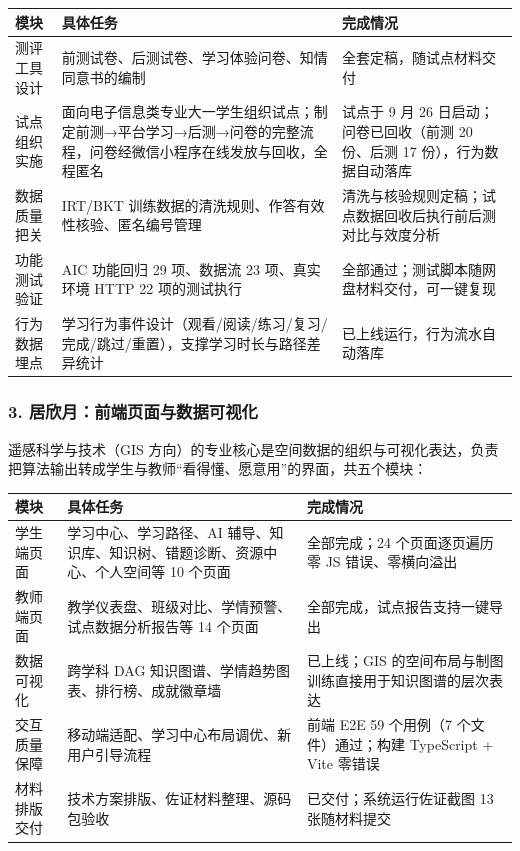 \documentclass[zihao=-4,a4paper,UTF8,fontset=windows]{ctexart}
\begin{document}
\par\noindent\begin{tabular}{|p{3.0cm}|p{4.5cm}|p{6.2cm}|}
\hline
\textbf{模块} & \textbf{具体任务} & \textbf{完成情况} \\ \hline
测评工具设计 & 前测试卷、后测试卷、学习体验问卷、知情同意书的编制 & 全套定稿，随试点材料交付 \\ \hline
试点组织实施 & 面向电子信息类专业大一学生组织试点；制定前测→平台学习→后测→问卷的完整流程，问卷经微信小程序在线发放与回收，全程匿名 & 试点于 9 月 26 日启动；问卷已回收（前测 20 份、后测 17 份），行为数据自动落库 \\ \hline
数据质量把关 & IRT/BKT 训练数据的清洗规则、作答有效性核验、匿名编号管理 & 清洗与核验规则定稿；试点数据回收后执行前后测对比与效度分析 \\ \hline
功能测试验证 & AIC 功能回归 29 项、数据流 23 项、真实环境 HTTP 22 项的测试执行 & 全部通过；测试脚本随网盘材料交付，可一键复现 \\ \hline
行为数据埋点 & 学习行为事件设计（观看/阅读/练习/复习/完成/跳过/重置），支撑学习时长与路径差异统计 & 已上线运行，行为流水自动落库 \\ \hline
\end{tabular}\par
\subsubsection{3. 居欣月：前端页面与数据可视化}


遥感科学与技术（GIS 方向）的专业核心是空间数据的组织与可视化表达，负责把算法输出转成学生与教师“看得懂、愿意用”的界面，共五个模块：

\par\noindent\begin{tabular}{|p{3.0cm}|p{4.5cm}|p{6.2cm}|}
\hline
\textbf{模块} & \textbf{具体任务} & \textbf{完成情况} \\ \hline
学生端页面 & 学习中心、学习路径、AI 辅导、知识库、知识树、错题诊断、资源中心、个人空间等 10 个页面 & 全部完成；24 个页面逐页遍历零 JS 错误、零横向溢出 \\ \hline
教师端页面 & 教学仪表盘、班级对比、学情预警、试点数据分析报告等 14 个页面 & 全部完成，试点报告支持一键导出 \\ \hline
数据可视化 & 跨学科 DAG 知识图谱、学情趋势图表、排行榜、成就徽章墙 & 已上线；GIS 的空间布局与制图训练直接用于知识图谱的层次表达 \\ \hline
交互质量保障 & 移动端适配、学习中心布局调优、新用户引导流程 & 前端 E2E 59 个用例（7 个文件）通过；构建 TypeScript + Vite 零错误 \\ \hline
材料排版交付 & 技术方案排版、佐证材料整理、源码包验收 & 已交付；系统运行佐证截图 13 张随材料提交 \\ \hline
\end{tabular}\par
\end{document}
